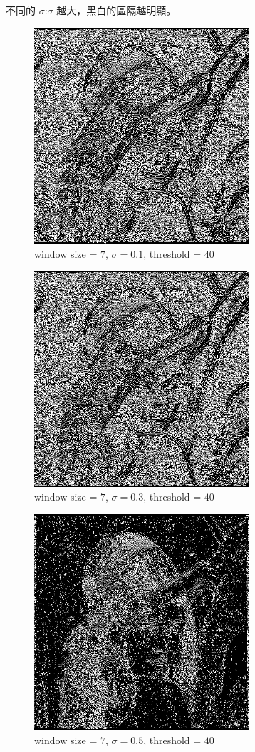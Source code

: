 \documentclass[conference]{IEEEtran}
\begin{document}
不同的 $\sigma$:$\sigma$ 越大，黑白的區隔越明顯。


\begin{figure}[H]
\centerline{\includegraphics[width=8cm]{lena04.png}}
\caption{window size = $7$, $\sigma=0.1$,  threshold = $40$}
\label{lena04}
\end{figure}

\begin{figure}[H]
\centerline{\includegraphics[width=8cm]{lena05.png}}
\caption{window size = $7$, $\sigma=0.3$,  threshold = $40$}
\label{lena05}
\end{figure}

\begin{figure}[H]
\centerline{\includegraphics[width=8cm]{lena06.png}}
\caption{window size = $7$, $\sigma=0.5$,  threshold = $40$}
\label{lena06}
\end{figure}
\end{document}
